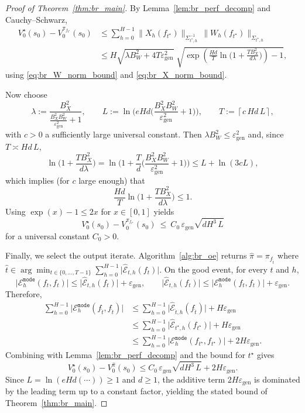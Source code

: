 \begin{proof}[Proof of Theorem~\ref{thm:br_main}]
By Lemma~\ref{lem:br_perf_decomp} and Cauchy--Schwarz,
\begin{align*}
V_0^\star(s_0)-V_0^{\pi_{f_{t^\star}}}(s_0)
&\le
\sum_{h=0}^{H-1}\|X_h(f_{t^\star})\|_{\Sigma_{t^\star,h}^{-1}}\,
\|W_h(f_{t^\star})\|_{\Sigma_{t^\star,h}} \\
&\le
H\sqrt{\lambda B_W^2 + 4T\varepsilon_{\mathrm{gen}}^2}\;
\sqrt{\exp\!\left(\frac{Hd}{T}\ln\Big(1+\frac{T B_X^2}{d\lambda}\Big)\right)-1},
\end{align*}
using \eqref{eq:br_W_norm_bound} and \eqref{eq:br_X_norm_bound}.

Now choose
\[
\lambda := \frac{B_X^2}{\frac{B_X^2B_W^2}{\varepsilon_{\mathrm{gen}}^2}+1},
\qquad
L := \ln\!\Big(eHd\Big(\frac{B_X^2B_W^2}{\varepsilon_{\mathrm{gen}}^2}+1\Big)\Big),
\qquad
T := \left\lceil c\,Hd\,L\right\rceil,
\]
with $c>0$ a sufficiently large universal constant.
Then $\lambda B_W^2\le \varepsilon_{\mathrm{gen}}^2$ and, since $T\asymp Hd\,L$,
\[
\ln\Big(1+\frac{T B_X^2}{d\lambda}\Big)
=
\ln\Big(1+\frac{T}{d}\Big(\frac{B_X^2B_W^2}{\varepsilon_{\mathrm{gen}}^2}+1\Big)\Big)
\le
L + \ln(3cL),
\]
which implies (for $c$ large enough) that
\[
\frac{Hd}{T}\ln\Big(1+\frac{T B_X^2}{d\lambda}\Big)\le 1.
\]
Using $\exp(x)-1\le 2x$ for $x\in[0,1]$ yields
\[
V_0^\star(s_0)-V_0^{\pi_{f_{t^\star}}}(s_0)
\ \le\
C_0\,\varepsilon_{\mathrm{gen}}\sqrt{dH^3\,L}
\]
for a universal constant $C_0>0$.

Finally, we select the output iterate.
Algorithm~\ref{alg:br_oe} returns $\hat\pi=\pi_{f_{\hat t}}$ where
$\hat t\in\arg\min_{t\in\{0,\dots,T-1\}}\sum_{h=0}^{H-1}\big|\widehat{\mathcal{E}}_{t,h}(f_t)\big|$.
On the good event, for every $t$ and $h$,
\[
\big|\mathcal{E}_h^{\mathtt{mode}}(f_t,f_t)\big|
\le
\big|\widehat{\mathcal{E}}_{t,h}(f_t)\big|+\varepsilon_{\mathrm{gen}},
\qquad
\big|\widehat{\mathcal{E}}_{t,h}(f_t)\big|
\le
\big|\mathcal{E}_h^{\mathtt{mode}}(f_t,f_t)\big|+\varepsilon_{\mathrm{gen}}.
\]
Therefore,
\begin{align*}
\sum_{h=0}^{H-1}\big|\mathcal{E}_h^{\mathtt{mode}}(f_{\hat t},f_{\hat t})\big|
&\le
\sum_{h=0}^{H-1}\big|\widehat{\mathcal{E}}_{\hat t,h}(f_{\hat t})\big| + H\varepsilon_{\mathrm{gen}} \\
&\le
\sum_{h=0}^{H-1}\big|\widehat{\mathcal{E}}_{t^\star,h}(f_{t^\star})\big| + H\varepsilon_{\mathrm{gen}} \\
&\le
\sum_{h=0}^{H-1}\big|\mathcal{E}_h^{\mathtt{mode}}(f_{t^\star},f_{t^\star})\big| + 2H\varepsilon_{\mathrm{gen}}.
\end{align*}
Combining with Lemma~\ref{lem:br_perf_decomp} and the bound for $t^\star$ gives
\[
V_0^\star(s_0)-V_0^{\hat\pi}(s_0)
\le
C_0\,\varepsilon_{\mathrm{gen}}\sqrt{dH^3\,L} + 2H\varepsilon_{\mathrm{gen}}.
\]
Since $L=\ln(eHd(\cdots))\ge 1$ and $d\ge 1$, the additive term $2H\varepsilon_{\mathrm{gen}}$ is
dominated by the leading term up to a constant factor, yielding the stated bound of
Theorem~\ref{thm:br_main}.
\end{proof}


